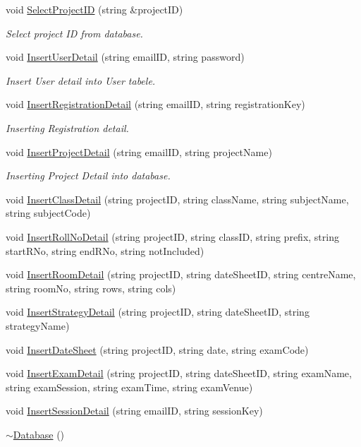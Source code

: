 \begin{DoxyCompactItemize}
\item 
void \hyperlink{classDatabase_a20f7ccadac8f3b67d4344f7da4594eda}{Select\-Project\-I\-D} (string \&project\-I\-D)
\begin{DoxyCompactList}\small\item\em Select project I\-D from database. \end{DoxyCompactList}\item 
void \hyperlink{classDatabase_ac2a20fd57ba7a51f819446e799d7100f}{Insert\-User\-Detail} (string email\-I\-D, string password)
\begin{DoxyCompactList}\small\item\em Insert User detail into User tabele. \end{DoxyCompactList}\item 
void \hyperlink{classDatabase_a0da52e0b3d6e36d0833da38a01e592ea}{Insert\-Registration\-Detail} (string email\-I\-D, string registration\-Key)
\begin{DoxyCompactList}\small\item\em Inserting Registration detail. \end{DoxyCompactList}\item 
void \hyperlink{classDatabase_a12b1d8ae6998720ad1842382ef5aa6cc}{Insert\-Project\-Detail} (string email\-I\-D, string project\-Name)
\begin{DoxyCompactList}\small\item\em Inserting Project Detail into database. \end{DoxyCompactList}\item 
void \hyperlink{classDatabase_ad0052cd5a48f5ba3233395096ba6e422}{Insert\-Class\-Detail} (string project\-I\-D, string class\-Name, string subject\-Name, string subject\-Code)
\item 
void \hyperlink{classDatabase_a91882082bd5309ba21d7250f0877ab39}{Insert\-Roll\-No\-Detail} (string project\-I\-D, string class\-I\-D, string prefix, string start\-R\-No, string end\-R\-No, string not\-Included)
\item 
void \hyperlink{classDatabase_a5730dcdace3989ed7187ca3f6e054ef7}{Insert\-Room\-Detail} (string project\-I\-D, string date\-Sheet\-I\-D, string centre\-Name, string room\-No, string rows, string cols)
\item 
void \hyperlink{classDatabase_a8a13b478ab9c5c9fabc07b9513530bc0}{Insert\-Strategy\-Detail} (string project\-I\-D, string date\-Sheet\-I\-D, string strategy\-Name)
\item 
void \hyperlink{classDatabase_ab410079853d849a9104be0689abee878}{Insert\-Date\-Sheet} (string project\-I\-D, string date, string exam\-Code)
\item 
void \hyperlink{classDatabase_a1c68383f46e3c3026ff53aeb4e5f76ab}{Insert\-Exam\-Detail} (string project\-I\-D, string date\-Sheet\-I\-D, string exam\-Name, string exam\-Session, string exam\-Time, string exam\-Venue)
\item 
void \hyperlink{classDatabase_a61963a0b66aca78ffa950b22ee959c47}{Insert\-Session\-Detail} (string email\-I\-D, string session\-Key)
\item 
\hyperlink{classDatabase_a84d399a2ad58d69daab9b05330e1316d}{$\sim$\-Database} ()
\end{DoxyCompactItemize}
